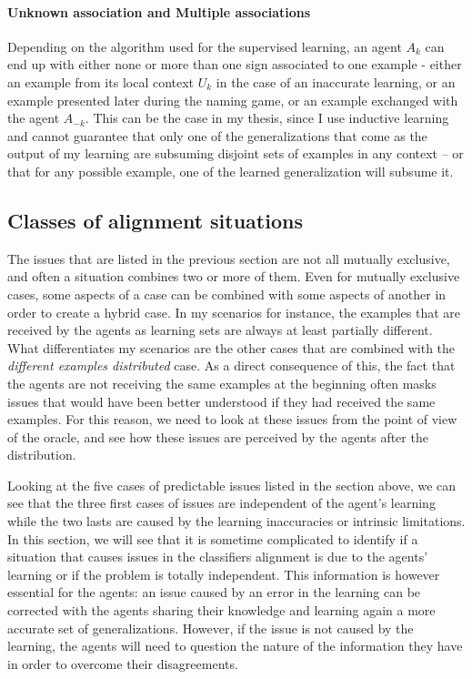 \paragraph{Unknown association and Multiple associations} Depending on the algorithm used for the supervised learning, an agent $A_{k}$ can end up with either none or more than one sign associated to one example - either an example from its local context $U_{k}$ in the case of an inaccurate learning, or an example presented later during the naming game, or an example exchanged with the agent $A_{-k}$. This can be the case in my thesis, since I use inductive learning and cannot guarantee that only one of the generalizations that come as the output of my learning are subsuming disjoint sets of examples in any context -- or that for any possible example, one of the learned generalization will subsume it.


\subsection{Classes of alignment situations}

The issues that are listed in the previous section are not all mutually exclusive, and often a situation combines two or more of them. Even for mutually exclusive cases, some aspects of a case can be combined with some aspects of another in order to create a hybrid case. In my scenarios for instance, the examples that are received by the agents as learning sets are always at least partially different. What differentiates my scenarios are the other cases that are combined with the \emph{different examples distributed} case. As a direct consequence of this, the fact that the agents are not receiving the same examples at the beginning often masks issues that would have been better understood if they had received the same examples. For this reason, we need to look at these issues from the point of view of the oracle, and see how these issues are perceived by the agents after the distribution.

Looking at the five cases of predictable issues listed in the section above, we can see that the three first cases of issues are independent of the agent's learning while the two lasts are caused by the learning inaccuracies or intrinsic limitations. In this section, we will see that it is sometime complicated to identify if a situation that causes issues in the classifiers alignment is due to the agents' learning or if the problem is totally independent. This information is however essential for the agents: an issue caused by an error in the learning can be corrected with the agents sharing their knowledge and learning again a more accurate set of generalizations. However, if the issue is not caused by the learning, the agents will need to question the nature of the information they have in order to overcome their disagreements.

